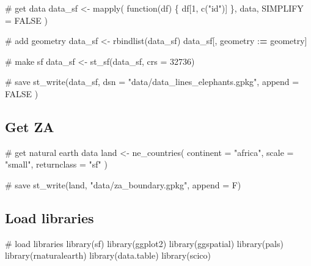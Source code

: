 \documentclass[]{article}
\newenvironment{Shaded}{}{}
\newcommand{\CommentTok}[1]{\textcolor[rgb]{0.00,0.50,0.00}{#1}}
\newcommand{\ControlFlowTok}[1]{\textcolor[rgb]{0.00,0.00,1.00}{#1}}
\newcommand{\DataTypeTok}[1]{#1}
\newcommand{\DecValTok}[1]{#1}
\newcommand{\ErrorTok}[1]{\textcolor[rgb]{1.00,0.00,0.00}{\textbf{#1}}}
\newcommand{\KeywordTok}[1]{\textcolor[rgb]{0.00,0.00,1.00}{#1}}
\newcommand{\NormalTok}[1]{#1}
\newcommand{\OperatorTok}[1]{#1}
\newcommand{\OtherTok}[1]{\textcolor[rgb]{1.00,0.25,0.00}{#1}}
\newcommand{\StringTok}[1]{\textcolor[rgb]{0.00,0.50,0.50}{#1}}
\begin{document}
\begin{Shaded}
\begin{Highlighting}[]
\CommentTok{# get data}
\NormalTok{data_sf <-}\StringTok{ }\KeywordTok{mapply}\NormalTok{(}
  \ControlFlowTok{function}\NormalTok{(df) \{}
\NormalTok{    df[}\DecValTok{1}\NormalTok{, }\KeywordTok{c}\NormalTok{(}\StringTok{"id"}\NormalTok{)]}
\NormalTok{  \},}
\NormalTok{  data,}
  \DataTypeTok{SIMPLIFY =} \OtherTok{FALSE}
\NormalTok{)}

\CommentTok{# add geometry}
\NormalTok{data_sf <-}\StringTok{ }\KeywordTok{rbindlist}\NormalTok{(data_sf)}
\NormalTok{data_sf[, geometry }\OperatorTok{:}\ErrorTok{=}\StringTok{ }\NormalTok{geometry]}

\CommentTok{# make sf}
\NormalTok{data_sf <-}\StringTok{ }\KeywordTok{st_sf}\NormalTok{(data_sf, }\DataTypeTok{crs =} \DecValTok{32736}\NormalTok{)}

\CommentTok{# save}
\KeywordTok{st_write}\NormalTok{(data_sf,}
  \DataTypeTok{dsn =} \StringTok{"data/data_lines_elephants.gpkg"}\NormalTok{,}
  \DataTypeTok{append =} \OtherTok{FALSE}
\NormalTok{)}
\end{Highlighting}
\end{Shaded}

\hypertarget{get-za}{%
\subsection{Get ZA}\label{get-za}}

\begin{Shaded}
\begin{Highlighting}[]
\CommentTok{# get natural earth data}
\NormalTok{land <-}\StringTok{ }\KeywordTok{ne_countries}\NormalTok{(}
  \DataTypeTok{continent =} \StringTok{"africa"}\NormalTok{,}
  \DataTypeTok{scale =} \StringTok{"small"}\NormalTok{,}
  \DataTypeTok{returnclass =} \StringTok{"sf"}
\NormalTok{)}

\CommentTok{# save}
\KeywordTok{st_write}\NormalTok{(land, }\StringTok{"data/za_boundary.gpkg"}\NormalTok{, }\DataTypeTok{append =}\NormalTok{ F)}
\end{Highlighting}
\end{Shaded}

\hypertarget{load-libraries-1}{%
\subsection{Load libraries}\label{load-libraries-1}}

\begin{Shaded}
\begin{Highlighting}[]
\CommentTok{# load libraries}
\KeywordTok{library}\NormalTok{(sf)}
\KeywordTok{library}\NormalTok{(ggplot2)}
\KeywordTok{library}\NormalTok{(ggspatial)}
\KeywordTok{library}\NormalTok{(pals)}
\KeywordTok{library}\NormalTok{(rnaturalearth)}
\KeywordTok{library}\NormalTok{(data.table)}
\KeywordTok{library}\NormalTok{(scico)}
\end{Highlighting}
\end{Shaded}
\end{document}
